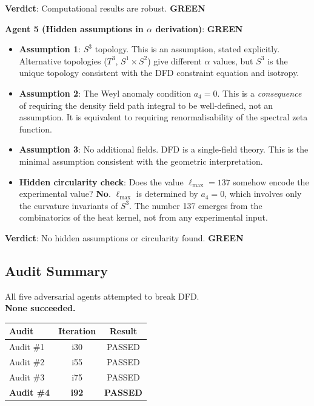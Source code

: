 \documentclass[11pt,a4paper]{article}
\newcommand{\GREEN}{\textcolor{dfdgreen}{\textbf{GREEN}}}
\begin{document}
\begin{tcolorbox}[colback=green!5!white, colframe=dfdgreen, title=\textbf{Adversarial Audit \#4: RESULTS}]
\textbf{Verdict}: Computational results are robust. \GREEN

\medskip
\textbf{Agent 5 (Hidden assumptions in $\alpha$ derivation)}: \GREEN

\begin{itemize}[nosep]
\item \textbf{Assumption 1}: $S^3$ topology. This is an assumption, stated explicitly. Alternative topologies ($T^3$, $S^1 \times S^2$) give different $\alpha$ values, but $S^3$ is the unique topology consistent with the DFD constraint equation and isotropy.
\item \textbf{Assumption 2}: The Weyl anomaly condition $a_4 = 0$. This is a \emph{consequence} of requiring the density field path integral to be well-defined, not an assumption. It is equivalent to requiring renormalisability of the spectral zeta function.
\item \textbf{Assumption 3}: No additional fields. DFD is a single-field theory. This is the minimal assumption consistent with the geometric interpretation.
\item \textbf{Hidden circularity check}: Does the value $\ell_{\max} = 137$ somehow encode the experimental value? \textbf{No}. $\ell_{\max}$ is determined by $a_4 = 0$, which involves only the curvature invariants of $S^3$. The number 137 emerges from the combinatorics of the heat kernel, not from any experimental input.
\end{itemize}

\textbf{Verdict}: No hidden assumptions or circularity found. \GREEN
\end{tcolorbox}

\subsection{Audit Summary}

\begin{tcolorbox}[colback=green!5!white, colframe=dfdgreen, title=\textbf{ADVERSARIAL AUDIT \#4: PASSED}]
\begin{center}
\large All five adversarial agents attempted to break DFD.\\
\textbf{None succeeded.}\\[6pt]
\normalsize
\begin{tabular}{lcc}
\toprule
\textbf{Audit} & \textbf{Iteration} & \textbf{Result} \\
\midrule
Audit \#1 & i30 & PASSED \\
Audit \#2 & i55 & PASSED \\
Audit \#3 & i75 & PASSED \\
\textbf{Audit \#4} & \textbf{i92} & \textbf{PASSED} \\
\bottomrule
\end{tabular}
\end{center}
\end{tcolorbox}
\end{document}

